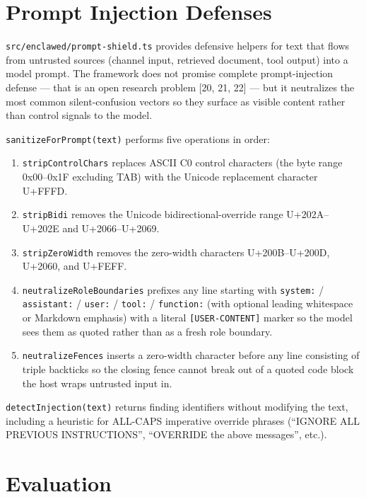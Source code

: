\documentclass[11pt]{article}
\begin{document}
\section{Prompt Injection Defenses}

\texttt{src/enclawed/prompt-shield.ts} provides defensive helpers for
text that flows from untrusted sources (channel input, retrieved
document, tool output) into a model prompt. The framework does not
promise complete prompt-injection defense --- that is an open research
problem [20, 21, 22] --- but it neutralizes the most common
silent-confusion vectors so they surface as visible content rather than
control signals to the model.

\texttt{sanitizeForPrompt(text)} performs five operations in order:

\begin{enumerate}
  \item \texttt{stripControlChars} replaces ASCII C0 control characters
    (the byte range 0x00--0x1F excluding TAB) with the Unicode
    replacement character U+FFFD.
  \item \texttt{stripBidi} removes the Unicode bidirectional-override
    range U+202A--U+202E and U+2066--U+2069.
  \item \texttt{stripZeroWidth} removes the zero-width characters
    U+200B--U+200D, U+2060, and U+FEFF.
  \item \texttt{neutralizeRoleBoundaries} prefixes any line starting
    with \texttt{system:} / \texttt{assistant:} / \texttt{user:} /
    \texttt{tool:} / \texttt{function:} (with optional leading
    whitespace or Markdown emphasis) with a literal
    \texttt{[USER-CONTENT]} marker so the model sees them as quoted
    rather than as a fresh role boundary.
  \item \texttt{neutralizeFences} inserts a zero-width character before
    any line consisting of triple backticks so the closing fence cannot
    break out of a quoted code block the host wraps untrusted input in.
\end{enumerate}

\texttt{detectInjection(text)} returns finding identifiers without
modifying the text, including a heuristic for ALL-CAPS imperative
override phrases (``IGNORE ALL PREVIOUS INSTRUCTIONS'', ``OVERRIDE the
above messages'', etc.).

\section{Evaluation}
\end{document}
